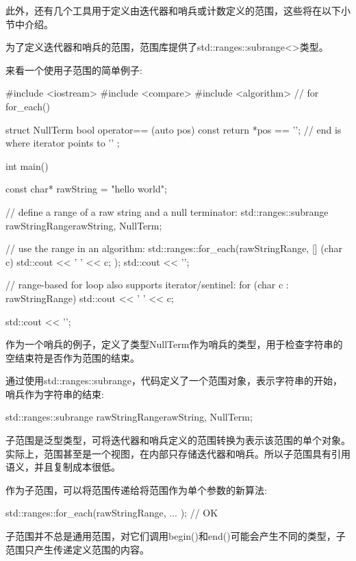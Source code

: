 此外，还有几个工具用于定义由迭代器和哨兵或计数定义的范围，这些将在以下小节中介绍。


为了定义迭代器和哨兵的范围，范围库提供了std::ranges::subrange<>类型。

来看一个使用子范围的简单例子:


\begin{cpp}
#include <iostream>
#include <compare>
#include <algorithm> // for for_each()

struct NullTerm {
	bool operator== (auto pos) const {
		return *pos == '\0'; // end is where iterator points to ’\0’
	}
};

int main()
{
	const char* rawString = "hello world";
	
	// define a range of a raw string and a null terminator:
	std::ranges::subrange rawStringRange{rawString, NullTerm{}};
	
	// use the range in an algorithm:
	std::ranges::for_each(rawStringRange,
	[] (char c) {
		std::cout << ' ' << c;
	});
	std::cout << '\n';
	
	// range-based for loop also supports iterator/sentinel:
	for (char c : rawStringRange) {
		std::cout << ' ' << c;
	}
	
	std::cout << '\n';
}
\end{cpp}

作为一个哨兵的例子，定义了类型NullTerm作为哨兵的类型，用于检查字符串的空结束符是否作为范围的结束。

通过使用std::ranges::subrange，代码定义了一个范围对象，表示字符串的开始，哨兵作为字符串的结束:

\begin{cpp}
std::ranges::subrange rawStringRange{rawString, NullTerm{}};
\end{cpp}

子范围是泛型类型，可将迭代器和哨兵定义的范围转换为表示该范围的单个对象。实际上，范围甚至是一个视图，在内部只存储迭代器和哨兵。所以子范围具有引用语义，并且复制成本很低。

作为子范围，可以将范围传递给将范围作为单个参数的新算法:

\begin{cpp}
std::ranges::for_each(rawStringRange, ... ); // OK
\end{cpp}

子范围并不总是通用范围，对它们调用begin()和end()可能会产生不同的类型，子范围只产生传递定义范围的内容。

